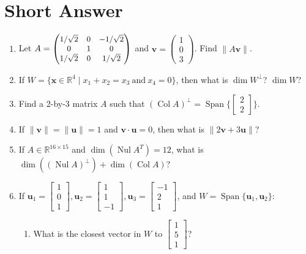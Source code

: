 \documentclass[10pt, titlepage]{article}
\renewcommand{\vec}[1]{\mathbf{#1}}
\DeclareMathOperator{\vspan}{Span}
\DeclareMathOperator{\colspace}{Col}
\DeclareMathOperator{\nullspace}{Nul}
\begin{document}
\section{\centering Short Answer}
	\begin{enumerate}
		\item Let \(A = \small \begin{pmatrix}1/\sqrt{2} & 0 & -1/\sqrt{2}\\ 0 & 1 & 0\\ 1/\sqrt{2} & 0 & 1/\sqrt{2}\end{pmatrix}\) and 
		\(\vec{v} = \begin{pmatrix}1 \\ 0 \\ 3\end{pmatrix}\). Find \(\|A\vec{v}\|\).
		\item If \(W = \{\vec{x} \in \mathbb{R}^4 \mid x_1 + x_2 = x_3 \ \text{and} \ x_4 = 0\}\), then what is \(\dim W^\perp\)? \(\dim W\)?
		\item Find a 2-by-3 matrix \(A\) such that \((\colspace A)^\perp = \vspan \biggl\{ \begin{bmatrix}2 \\ 2\end{bmatrix}\biggr\}\).
		\item If \(\|\vec{v}\| = \|\vec{u}\| = 1\) and \(\vec{v} \cdot \vec{u} = 0\), then what is \(\|2\vec{v} + 3\vec{u}\|\)?
		\item If \(A \in \mathbb{R}^{16 \times 15}\) and \(\dim (\nullspace A^T) = 12\), what is \(\dim((\nullspace A)^\perp) + \dim (\colspace A)\)?
		\item If \(\vec{u}_1 = \begin{bmatrix}1 \\ 0 \\ 1\end{bmatrix}, \vec{u}_2 = \begin{bmatrix}1 \\ 1 \\ -1\end{bmatrix}, 
			      \vec{u}_3 = \begin{bmatrix}-1 \\ 2 \\ 1\end{bmatrix}\), and \(W = \vspan \{\vec{u}_1, \vec{u}_2\}\):
			\begin{enumerate}
				\item What is the closest vector in \(W\) to \(\begin{bmatrix}1 \\ 5 \\ 1\end{bmatrix}\)?

\end{enumerate}
\end{enumerate}
\end{document}
